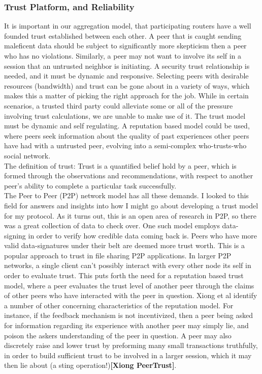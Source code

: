 \documentclass[12pt]{article}
\newcommand{\lcite}[1]
{{\bfseries\color{orange}[#1]}}
\begin{document}
		\subsubsection{Trust Platform, and Reliability}

			It is important in our aggregation model, that participating routers have a well founded trust established between each other. A peer that is caught sending maleficent data should be subject to significantly more skepticism then a peer who has no violations. Similarly, a peer may not want to involve its self in a session that an untrusted neighbor is initiating. A security trust relationship is needed, and it must be dynamic and responsive. Selecting peers with desirable resources (bandwidth) and trust can be gone about in a variety of ways, which makes this a matter of picking the right approach for the job. While in certain scenarios, a trusted third party could alleviate some or all of the pressure involving trust calculations, we are unable to make use of it. The trust model must be dynamic and self regulating. A reputation based model could be used, where peers seek information about the quality of past experiences other peers have had with a untrusted peer, evolving into a semi-complex who-trusts-who social network.\\

			The definition of trust: Trust is a quantified belief hold by a peer, which is formed through the observations and recommendations, with respect to another peer’s ability to complete a particular task successfully. \\

			The Peer to Peer (P2P) network model has all these demands. I looked to this field for answers and insights into how I might go about developing a trust model for my protocol. As it turns out, this is an open area of research in P2P, so there was a great collection of data to check over. One such model employs data-signing in order to verify how credible data coming back is. Peers who have more valid data-signatures under their belt are deemed more trust worth. This is a popular approach to trust in file sharing P2P applications. In larger P2P networks, a single client can't possibly interact with every other node its self in order to evaluate trust. This puts forth the need for a reputation based trust model, where a peer evaluates the trust level of another peer through the claims of other peers who have interacted with the peer in question. Xiong et al identify a number of other concerning characteristics of the reputation model. For instance, if the feedback mechanism is not incentivized, then a peer being asked for information regarding its experience with another peer may simply lie, and poison the askers understanding of the peer in question. A peer may also discretely raise and lower trust by preforming many small transactions truthfully, in order to build sufficient trust to be involved in a larger session, which it may then lie about (a sting operation!)\lcite{Xiong PeerTrust}.\\
\end{document}
